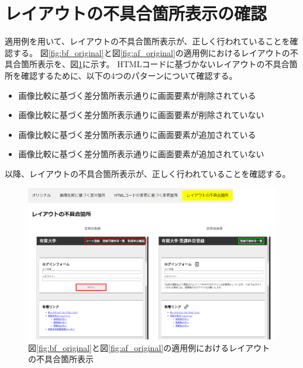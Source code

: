\section{レイアウトの不具合箇所表示の確認}
適用例を用いて、レイアウトの不具合箇所表示が、正しく行われていることを確認する。
図\ref{fig:bf_original}と図\ref{fig:af_original}の適用例におけるレイアウトの不具合箇所表示を、図\ref{fig: 5_app3}に示す。
HTMLコードに基づかないレイアウトの不具合箇所を確認するために、以下の4つのパターンについて確認する。
\begin{itemize}
    \item 画像比較に基づく差分箇所表示通りに画面要素が削除されている
    \item 画像比較に基づく差分箇所表示通りに画面要素が削除されていない
    \item 画像比較に基づく差分箇所表示通りに画面要素が追加されている
    \item 画像比較に基づく差分箇所表示通りに画面要素が追加されていない
\end{itemize}
以降、レイアウトの不具合箇所表示が、正しく行われていることを確認する。
\begin{figure}[tp]
    \begin{center}
        \includegraphics[width=1.0\columnwidth]{image/5/new_effect.png}
        \caption{図\ref{fig:bf_original}と図\ref{fig:af_original}の適用例におけるレイアウトの不具合箇所表示}
        \label{fig: 5_app3}
    \end{center}
\end{figure}




